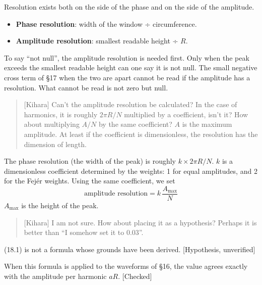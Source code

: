 \documentclass[
  a4paper,
]{article}
\providecommand{\tightlist}{%
  \setlength{\itemsep}{0pt}\setlength{\parskip}{0pt}}
\begin{document}
Resolution exists both on the side of the phase and on the side of the
amplitude.

\begin{itemize}
\tightlist
\item
  \textbf{Phase resolution}: width of the window ÷ circumference.
\item
  \textbf{Amplitude resolution}: smallest readable height ÷ \(R\).
\end{itemize}

To say ``not null'', the amplitude resolution is needed first. Only when
the peak exceeds the smallest readable height can one say it is not
null. The small negative cross term of §17 when the two are apart cannot
be read if the amplitude has a resolution. What cannot be read is not
zero but null.

\begin{quote}
{[}Kihara{]} Can't the amplitude resolution be calculated? In the case
of harmonics, it is roughly \(2\pi R/N\) multiplied by a coefficient,
isn't it? How about multiplying \(A/N\) by the same coefficient? \(A\)
is the maximum amplitude. At least if the coefficient is dimensionless,
the resolution has the dimension of length.
\end{quote}

The phase resolution (the width of the peak) is roughly
\(k\times2\pi R/N\). \(k\) is a dimensionless coefficient determined by
the weights: 1 for equal amplitudes, and 2 for the Fejér weights. Using
the same coefficient, we set \[
\text{amplitude resolution} = k\,\frac{A_{\max}}{N} \tag{18.1}
\] \(A_{\max}\) is the height of the peak.

\begin{quote}
{[}Kihara{]} I am not sure. How about placing it as a hypothesis?
Perhaps it is better than ``I somehow set it to 0.03''.
\end{quote}

(18.1) is not a formula whose grounds have been derived. {[}Hypothesis,
unverified{]}

When this formula is applied to the waveforms of §16, the value agrees
exactly with the amplitude per harmonic \(aR\). {[}Checked{]}
\end{document}
